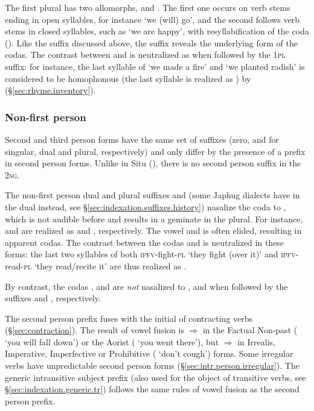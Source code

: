 The first plural  has two allomorphs,  and . The first one occurs on verb stems ending in open syllables, for instance  `we (will) go', and the second follows verb stems in closed syllables, such as  `we are happy', with resyllabification of the coda (). Like the  suffix discussed above, the suffix  reveals the underlying form of the codas. The contrast between  and  is neutralized as  when followed by the \textsc{1pl} suffix: for instance, the last syllable of  `we made a fire'  and  `we planted radish' is considered to be homophonous (the last syllable is realized as ) by  (§\ref{sec:rhyme.inventory}).

\subsubsection{Non-first person} \label{sec:intr.23}
   
Second and third person forms have the same set of suffixes (zero,  and  for singular, dual and plural, respectively) and only differ by the presence of a  prefix in second person forms. Unlike in Situ (\citealt[197--208]{linxr93jiarong}), there is no second person suffix in the \textsc{2sg}.

The non-first person dual and plural suffixes  and  (some Japhug dialects have  in the dual instead, see §\ref{sec:indexation.suffixes.history}) nasalize the coda  to , which is not audible before  and results in a geminate in the plural. For instance,  and  are realized as  and , respectively. The vowel  and  is often elided, resulting in apparent  codas. The contrast between the codas  and  is neutralized in these forms: the last two syllables of both  \textsc{ipfv}-fight-\textsc{pl} `they fight (over it)' and   \textsc{ipfv}-read-\textsc{pl} `they read/recite it' are thus realized as . 

By contrast, the codas ,  and  are \textit{not} nasalized to ,  and  when followed by the suffixes  and , respectively.

The second person  prefix fuses with the initial  of contracting verbs (§\ref{sec:contraction}). The result of vowel fusion is  $\Rightarrow$  in the Factual Non-past ( `you will fall down') or the Aorist ( `you went there'), but  $\Rightarrow$  in Irrealis, Imperative, Imperfective or Prohibitive ( `don't cough') forms. Some irregular verbs have unpredictable second person forms (§\ref{sec:intr.person.irregular}). The generic intransitive subject prefix  (also used for the object of transitive verbs, see §\ref{sec:indexation.generic.tr}) follows the same rules of vowel fusion as the second person prefix.


